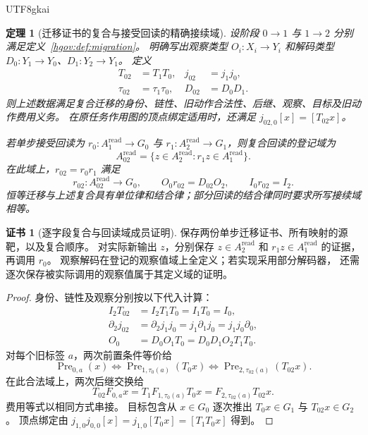 \documentclass[12pt,a4paper,openany,notitlepage]{report}
\theoremstyle{plain}
\newtheorem{theorem}{定理}[chapter]
\theoremstyle{definition}
\newtheorem*{certificate}{证书}
\theoremstyle{remark}
\def\mathcal#1{#1}\def\mathsf#1{#1}\def\mathbb#1{#1}%
\begin{document}
\begin{CJK*}{UTF8}{gkai}
\begin{theorem}[迁移证书的复合与接受回读的精确接续域]
\label{exp:gov:migration-composition}
设阶段 $0\to1$ 与 $1\to2$ 分别满足定义~\ref{hgov:def:migration}。
明确写出观察类型 $O_i:X_i\to Y_i$ 和解码类型
$D_0:Y_1\to Y_0$、$D_1:Y_2\to Y_1$。
定义
\[
\begin{aligned}
 T_{02}&=T_1T_0,& j_{02}&=j_1j_0,\\
 \tau_{02}&=\tau_1\tau_0,& D_{02}&=D_0D_1.
\end{aligned}
\]
则上述数据满足复合迁移的身份、链性、旧动作合法性、后继、观察、目标及旧动作费用义务。
在原任务作用图的顶点绑定适用时，还满足
$j_{02,0}[x]=[T_{02}x]$。

若单步接受回读为
$r_0:\mathcal A_1^{\mathrm{read}}\to G_0$ 与
$r_1:\mathcal A_2^{\mathrm{read}}\to G_1$，则复合回读的登记域为
\[
 \mathcal A_{02}^{\mathrm{read}}
 =\{z\in\mathcal A_2^{\mathrm{read}}:
             r_1z\in\mathcal A_1^{\mathrm{read}}\}.
\]
在此域上，$r_{02}=r_0r_1$ 满足
\[
 r_{02}:\mathcal A_{02}^{\mathrm{read}}\to G_0,
 \qquad O_0r_{02}=D_{02}O_2,
 \qquad I_0r_{02}=I_2.
\]
恒等迁移与上述复合具有单位律和结合律；部分回读的结合律同时要求所写接续域相等。
\end{theorem}
\begin{certificate}[逐字段复合与回读域成员证明]
保存两份单步迁移证书、所有映射的源靶，以及复合顺序。
对实际新输出 $z$，分别保存
$z\in\mathcal A_2^{\mathrm{read}}$ 和
$r_1z\in\mathcal A_1^{\mathrm{read}}$ 的证据，再调用 $r_0$。
观察解码在登记的观察值域上全定义；若实现采用部分解码器，
还需逐次保存被实际调用的观察值属于其定义域的证明。
\end{certificate}
\begin{proof}
身份、链性及观察分别按以下代入计算：
\[
\begin{aligned}
 I_2T_{02}&=I_2T_1T_0=I_1T_0=I_0,\\
 \partial_2j_{02}
 &=\partial_2j_1j_0=j_1\partial_1j_0=j_1j_0\partial_0,\\
 O_0&=D_0O_1T_0=D_0D_1O_2T_1T_0.
\end{aligned}
\]
对每个旧标签 $a$，两次前置条件等价给
\[
 \operatorname{Pre}_{0,a}(x)
 \Longleftrightarrow
 \operatorname{Pre}_{1,\tau_0(a)}(T_0x)
 \Longleftrightarrow
 \operatorname{Pre}_{2,\tau_{02}(a)}(T_{02}x).
\]
在此合法域上，两次后继交换给
\[
 T_{02}F_{0,a}x
 =T_1F_{1,\tau_0(a)}T_0x
 =F_{2,\tau_{02}(a)}T_{02}x.
\]
费用等式以相同方式串接。
目标包含从 $x\in G_0$ 逐次推出 $T_0x\in G_1$ 与 $T_{02}x\in G_2$。
顶点绑定由 $j_{1,0}j_{0,0}[x]=j_{1,0}[T_0x]=[T_1T_0x]$ 得到。


\end{proof}
\end{CJK*}
\end{document}
